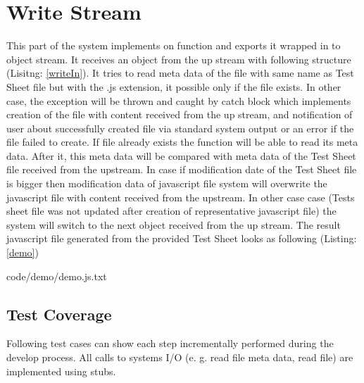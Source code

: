 \section{Write Stream}

This part of the system implements on function and exports it wrapped in to object stream. It receives an object from the up stream with following structure (Lisitng: \ref{writeIn}). It tries to read meta data of the file with same name as Test Sheet file but with the .js extension, it possible only if the file exists. In other case, the exception will be thrown and caught by catch block which implements creation of the file with content received from the up stream, and notification of user about successfully created file via standard system output or an error if the file failed to create. If file already exists the function will be able to read its meta data. After it, this meta data will be compared with meta data of the Test Sheet file received from the upstream. In case if modification date of the Test Sheet file is bigger then modification data of javascript file system will overwrite the javascript file with content received from the upstream. In other case case (Tests sheet file was not updated after creation of representative javascript file) the system will switch to the next object received from the up stream. The result javascript file generated from the provided Test Sheet looks as following (Listing: \ref{demo})


{code/demo/demo.js.txt}

%

\subsection{Test Coverage}
Following test cases can show each step incrementally performed during the develop process. All calls to systems I/O (e. g. read file meta data, read file) are implemented using stubs.
%


